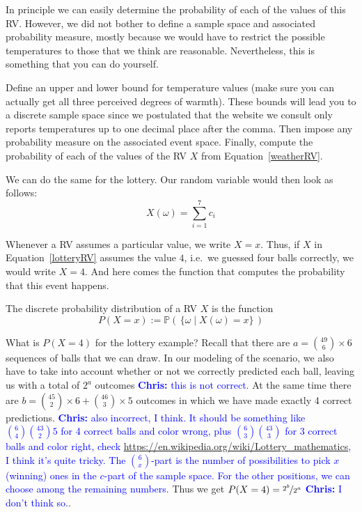 \documentclass[a4paper,11pt,leqno]{report}
\newcommand{\chris}[1]{ \textcolor{blue}{\textbf{Chris:} #1}}
\begin{document}
In principle we can easily determine the probability of each of the values of this RV. However, we did
not bother to define a sample space and associated probability measure, mostly because we would have to
restrict the possible temperatures to those that we think are reasonable. Nevertheless, this is something
that you can do yourself.

\begin{Exercise}
Define an upper and lower bound for temperature values (make sure you can actually get all three perceived
degrees of warmth). These bounds will lead you to a discrete sample space since we postulated
that the website we consult only reports temperatures up to one decimal place after the comma. Then impose
any probability measure on the associated event space. Finally, compute the probability of each of the
values of the RV $ X $ from Equation~\eqref{weatherRV}.
\end{Exercise}

We can do the same for the lottery. Our random variable would then look as follows:
\begin{equation}\label{lotteryRV}
X(\omega) = \overset{7}{\underset{i=1}{\sum}} c_{i}
\end{equation}

Whenever a RV assumes a particular value, we write $ X=x $. Thus, if $ X $ in Equation~\eqref{lotteryRV} assumes the
value $ 4 $, i.e.\ we guessed four balls correctly, we would write $ X=4 $. And here comes the function
that computes the probability that this event happens.

\begin{Definition}
The discrete probability distribution of a RV $ X $ is the function
$$ P(X=x) := \mathbb{P}( \, \{\omega \mid X(\omega)=x\} \, ) $$
\end{Definition}

What is $ P(X=4) $ for the lottery example? Recall that there are 
$ a = \binom{49}{6} \times 6 $ sequences of balls that we can draw. In our modeling of the scenario, we also have to take
into account whether or not we correctly predicted each ball, leaving us with a total of $ 2^{a} $
outcomes\chris{this is not correct}. At the same time there are $ b = \binom{45}{2} \times 6 + \binom{46}{3} \times 5 $ outcomes in which we have made 
exactly 4 correct predictions.\chris{also incorrect, I think. It should be something like $\binom{6}{4} \binom{43}{2} 5$ for 4 correct balls and color wrong, plus $\binom{6}{3}\binom{43}{3}$ for 3 correct balls and color right, check \url{https://en.wikipedia.org/wiki/Lottery_mathematics}, I think it's quite tricky. The $\binom{6}{x}$-part is the number of possibilities to pick $x$ (winning) ones in the $c$-part of the sample space. For the other positions, we can choose among the remaining numbers.} Thus we get $ P(X=4) = \nicefrac{2^{b}}{2^{a}} $ \chris{I don't think so.}.
\end{document}
